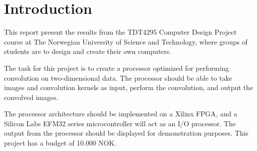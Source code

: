 \chapter{Introduction}
\label{subsec:assignment-text}
This report present the results from the TDT4295 Computer Design Project course at The Norwegian University of Science and Technology, where groups of students are to design and create their own computers.

The task for this project is to create a processor optimized for performing convolution on two-dimensional data. The processor should be able to take images and convolution kernels as input, perform the convolution, and output the convolved images.

The processor architecture should be implemented on a Xilinx FPGA, and a Silicon Labs EFM32 series microcontroller will act as an I/O processor. The output from the processor should be displayed for demonstration purposes. This project has a budget of 10.000 NOK.



